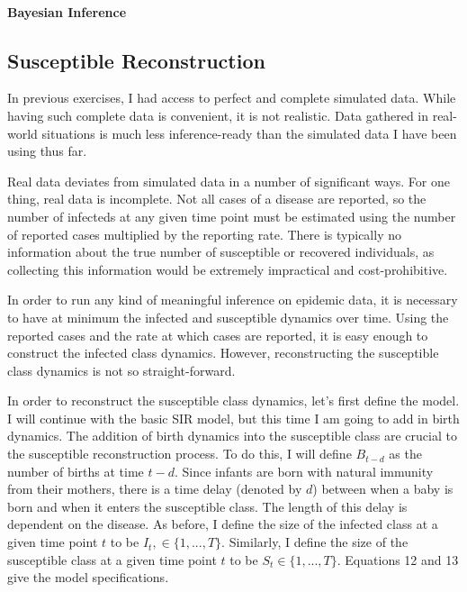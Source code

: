 \documentclass{article}
\begin{document}
\paragraph{Bayesian Inference}



\subsection{Susceptible Reconstruction}

In previous exercises, I had access to perfect and complete simulated data. While having such complete data is convenient, it is not realistic. Data gathered in real-world situations is much less inference-ready than the simulated data I have been using thus far.

Real data deviates from simulated data in a number of significant ways. For one thing, real data is incomplete. Not all cases of a disease are reported, so the number of infecteds at any given time point must be estimated using the number of reported cases multiplied by the reporting rate. There is typically no information about the true number of susceptible or recovered individuals, as collecting this information would be extremely impractical and cost-prohibitive. 

In order to run any kind of meaningful inference on epidemic data, it is necessary to have at minimum the infected and susceptible dynamics over time. Using the reported cases and the rate at which cases are reported, it is easy enough to construct the infected class dynamics. However, reconstructing the susceptible class dynamics is not so straight-forward. 

In order to reconstruct the susceptible class dynamics, let's first define the model. I will continue with the basic SIR model, but this time I am going to add in birth dynamics. The addition of birth dynamics into the susceptible class are crucial to the susceptible reconstruction process. To do this, I will define $B_{t-d}$ as the number of births at time $t-d$. Since infants are born with natural immunity from their mothers, there is a time delay (denoted by $d$) between when a baby is born and when it enters the susceptible class. The length of this delay is dependent on the disease. As before, I define the size of the infected class at a given time point $t$ to be $I_{t}, \in{\{1,...,T\}}$. Similarly, I define the size of the susceptible class at a given time point $t$ to be $S_{t} \in{\{1,...,T\}}$. Equations 12 and 13 give the model specifications. 
\end{document}
